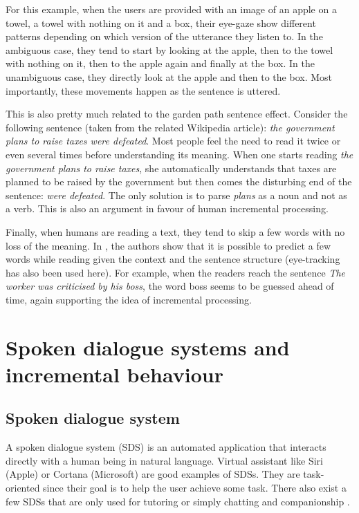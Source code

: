            For this example, when the users are provided with an image of an apple on a towel, a towel with nothing on it and a box, their eye-gaze show different patterns depending on which version of the utterance they listen to. In the ambiguous case, they tend to start by looking at the apple, then to the towel with nothing on it, then to the apple again and finally at the box. In the unambiguous case, they directly look at the apple and then to the box. Most importantly, these movements happen as the sentence is uttered.

           This is also pretty much related to the garden path sentence effect. Consider the following sentence (taken from the related Wikipedia article): \textit{the government plans to raise taxes were defeated}. Most people feel the need to read it twice or even several times before understanding its meaning. When one starts reading \textit{the government plans to raise taxes}, she automatically understands that taxes are planned to be raised by the government but then comes the disturbing end of the sentence: \textit{were defeated}. The only solution is to parse \textit{plans} as a noun and not as a verb. This is also an argument in favour of human incremental processing.

           Finally, when humans are reading a text, they tend to skip a few words with no loss of the meaning. In \cite{Ilkin2011}, the authors show that it is possible to predict a few words while reading given the context and the sentence structure (eye-tracking has also been used here). For example, when the readers reach the sentence \textit{The worker was criticised by his boss}, the word boss seems to be guessed ahead of time, again supporting the idea of incremental processing.


\section{Spoken dialogue systems and incremental behaviour}
    
	\subsection{Spoken dialogue system}
        \label{soa:sds}
        
	A spoken dialogue system (SDS) is an automated application that interacts directly with a human being in natural language. Virtual assistant like Siri (Apple) or Cortana (Microsoft) are good examples of SDSs. They are task-oriented since their goal is to help the user achieve some task. There also exist a few SDSs that are only used for tutoring \cite{Daubigney2013} or simply chatting and companionship \cite{Sidner2013}.
	
